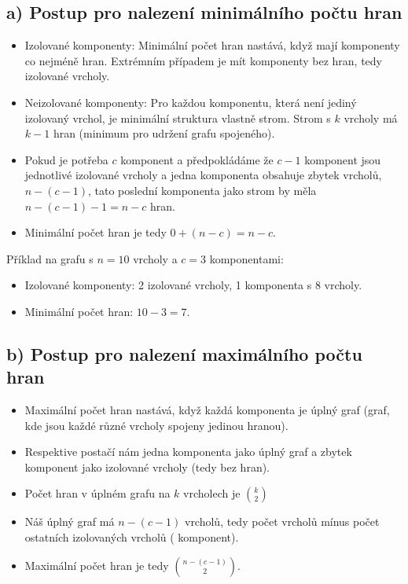 \documentclass[10pt, a4paper]{ReportSheet}
\begin{document}
    \subsection{a) Postup pro nalezení minimálního počtu hran}
    \begin{itemize}
        \item Izolované komponenty: Minimální počet hran nastává, když mají komponenty co nejméně hran. Extrémním
        případem je mít komponenty bez hran, tedy izolované vrcholy.
        \item Neizolované komponenty: Pro každou komponentu, která není jediný izolovaný vrchol, je minimální
        struktura vlastně strom. Strom s $k$ vrcholy má $k-1$ hran (minimum pro udržení grafu spojeného).
        \item Pokud je potřeba $c$ komponent a předpokládáme že $c-1$ komponent jsou jednotlivé izolované vrcholy a jedna komponenta obsahuje zbytek vrcholů, $n-(c-1)$, tato poslední komponenta jako strom by měla $n-(c-1)-1=n-c$ hran.
        \item Minimální počet hran je tedy $0 + (n-c) = n-c$.
    \end{itemize}

    Příklad na grafu s $n=10$ vrcholy a $c=3$ komponentami:
    \begin{itemize}
        \item Izolované komponenty: 2 izolované vrcholy, 1 komponenta s 8 vrcholy.
        \item Minimální počet hran: $10 - 3 = 7$.
    \end{itemize}


    \subsection{b) Postup pro nalezení maximálního počtu hran}
    \begin{itemize}
        \item Maximální počet hran nastává, když každá komponenta je úplný graf (graf, kde jsou každé různé vrcholy spojeny jedinou hranou).
        \item Respektive postačí nám jedna komponenta jako úplný graf a zbytek komponent jako izolované vrcholy (tedy
        bez hran).
        \item Počet hran v úplném grafu na $k$ vrcholech je $\binom{k}{2}$
        \item Náš úplný graf má $n-(c-1)$ vrcholů, tedy počet vrcholů mínus počet ostatních izolovaných vrcholů (
        komponent).
        \item Maximální počet hran je tedy $\binom{n-(c-1)}{2}$.
    \end{itemize}
\end{document}
